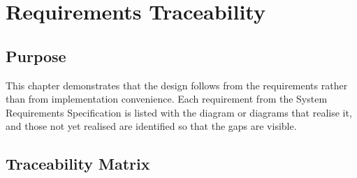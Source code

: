 \chapter{Requirements Traceability}
\label{ch:traceability}

\section{Purpose}

This chapter demonstrates that the design follows from the requirements rather
than from implementation convenience. Each requirement from the System
Requirements Specification is listed with the diagram or diagrams that realise
it, and those not yet realised are identified so that the gaps are visible.

\section{Traceability Matrix}

